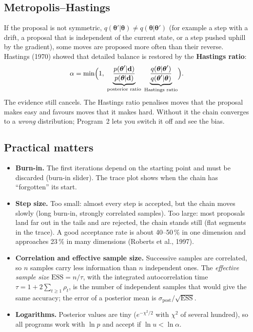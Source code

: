\documentclass[11pt,a4paper]{article}
\newcommand{\ctl}[1]{\textsf{#1}}                              %
\newcommand{\vth}{\boldsymbol{\theta}}
\newcommand{\vd}{\mathbf{d}}
\begin{document}
\subsection{Metropolis--Hastings}\label{sec:mh}
If the proposal is not symmetric, $q(\vth'|\vth)\neq q(\vth|\vth')$ (for example a step with a drift, a proposal
that is independent of the current state, or a step pushed uphill by the gradient), some moves are proposed
more often than their reverse. Hastings (1970) showed that detailed balance is restored by the
\textbf{Hastings ratio}:
\begin{equation}
  \alpha = \min\Bigl(1,\;\underbrace{\frac{p(\vth'|\vd)}{p(\vth|\vd)}}_{\text{posterior ratio}}\;
                         \underbrace{\frac{q(\vth|\vth')}{q(\vth'|\vth)}}_{\text{Hastings ratio}}\Bigr).
  \label{eq:mh}
\end{equation}
The evidence still cancels. The Hastings ratio penalises moves that the proposal makes easy and favours moves
that it makes hard. Without it the chain converges to a \emph{wrong} distribution; Program~2 lets you switch it
off and see the bias.

\subsection{Practical matters}\label{sec:practical}
\begin{itemize}
\item \textbf{Burn-in.} The first iterations depend on the starting point and must be discarded
  (\ctl{burn-in} slider). The trace plot shows when the chain has ``forgotten'' its start.
\item \textbf{Step size.} Too small: almost every step is accepted, but the chain moves slowly (long burn-in,
  strongly correlated samples). Too large: most proposals land far out in the tails and are rejected, the chain
  stands still (flat segments in the trace). A good acceptance rate is about 40--50\,\% in one dimension and
  approaches 23\,\% in many dimensions (Roberts et al., 1997).
\item \textbf{Correlation and effective sample size.} Successive samples are correlated, so $n$ samples carry
  less information than $n$ independent ones. The \emph{effective sample size}
  $\text{ESS}=n/\tau$, with the integrated autocorrelation time $\tau=1+2\sum_{t\ge1}\rho_t$, is the number of
  independent samples that would give the same accuracy; the error of a posterior mean is
  $\sigma_\text{post}/\sqrt{\text{ESS}}$.
\item \textbf{Logarithms.} Posterior values are tiny ($e^{-\chi^2/2}$ with $\chi^2$ of several hundred), so all
  programs work with $\ln p$ and accept if $\ln u<\ln\alpha$.
\end{itemize}
\end{document}

